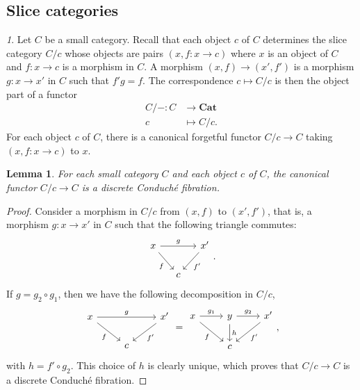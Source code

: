 \documentclass[reqno]{amsart}
\theoremstyle{plain}
\newtheorem{lemma}[subsubsection]{Lemma}
\theoremstyle{definition}
\theoremstyle{remark}
\newtheorem{paragr}[subsubsection]{} %
\newcommand{\pair}[2]{(#1,#2)}       %
\newcommand{\tr}[2]{#1/#2} %
\newcommand{\ctg}[1]{\mathbf{#1}}  %
\newcommand{\Cat}{\ctg{Cat}}   %
\begin{document}
\subsection{Slice categories}\label{subsection:slice_cat}
\begin{paragr}\label{paragr:slice_cat}
  Let $C$ be a small category. Recall that each object $c$ of $C$
  determines the slice category $\tr Cc$ whose objects are pairs
  $\pair{x}{f\colon x \to c}$ where $x$ is an object of $C$ and $f:x\to c$ is
  a morphism in $C$. A morphism $\pair xf\to \pair{x'}{f'}$ is a
  morphism $g:x\to x'$ in $C$ such that $f'g=f$. The correspondence
  $c\mapsto \tr Cc$ is then the object part of a functor
\[
    \begin{aligned}
      \tr{C}{-} \colon C &\to \Cat \\
      c &\mapsto \tr{C}{c}.
    \end{aligned}
  \]
  For each object $c$ of $C$, there is a canonical forgetful functor
  $\tr Cc\to C$
  taking $\pair x{f:x\to c}$ to $x$.
\end{paragr}

\begin{lemma}\label{lemma:slicescond}
  For each small category $C$ and each object $c$ of $C$, the canonical functor
 $\tr Cc\to C$
  is a discrete Conduché fibration.
\end{lemma}
\begin{proof}
Consider a morphism in $\tr Cc$ from $\pair xf$ to $\pair{x'}{f'}$, that
is, a morphism $g:x\to x'$ in $C$ such that the following triangle commutes:
\[
    \begin{tikzcd}[column sep=small]
      x \ar[rr,"g"] \ar[dr,"f"'] && x'\ar[dl,"f'"] \\
      &c&
    \end{tikzcd}.
  \]
  If $g=g_2\circ g_1$, then we have the following decomposition in
  $\tr{C}{c}$,
  \[
      \begin{tikzcd}
      x \ar[rr,"g"] \ar[dr,"f"'] && x'\ar[dl,"f'"] \\
      &c&
    \end{tikzcd}
    =
    \begin{tikzcd}
      x \ar[r,"g_1"] \ar[dr,"f"']& y \ar[r,"g_2"] \ar[d,"h"] &
      x' \ar[dl,"f'"] \\
      &c&
    \end{tikzcd},
  \]
  with $h=f'\circ g_2$. This choice of $h$ is clearly unique, which
  proves that $\tr{C}{c} \to C$ is a discrete Conduché fibration.
\end{proof}
\end{document}
